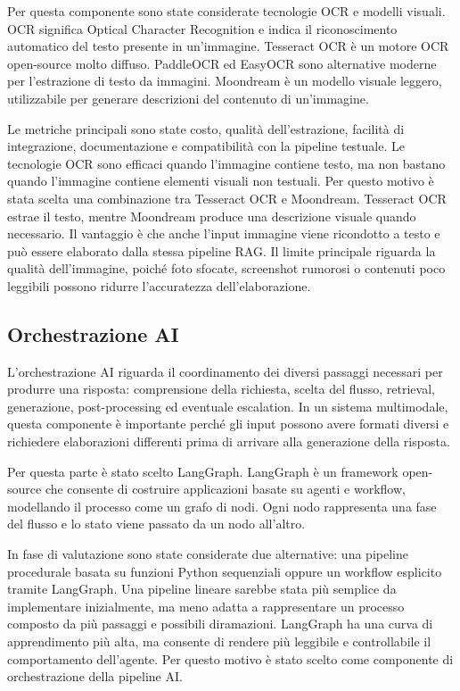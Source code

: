 Per questa componente sono state considerate tecnologie OCR e modelli visuali. OCR significa Optical Character Recognition e indica il riconoscimento automatico del testo presente in un’immagine. Tesseract OCR è un motore OCR open-source molto diffuso. PaddleOCR ed EasyOCR sono alternative moderne per l’estrazione di testo da immagini. Moondream è un modello visuale leggero, utilizzabile per generare descrizioni del contenuto di un’immagine.

Le metriche principali sono state costo, qualità dell’estrazione, facilità di integrazione, documentazione e compatibilità con la pipeline testuale. Le tecnologie OCR sono efficaci quando l’immagine contiene testo, ma non bastano quando l’immagine contiene elementi visuali non testuali. Per questo motivo è stata scelta una combinazione tra Tesseract OCR e Moondream. Tesseract OCR estrae il testo, mentre Moondream produce una descrizione visuale quando necessario. Il vantaggio è che anche l’input immagine viene ricondotto a testo e può essere elaborato dalla stessa pipeline RAG. Il limite principale riguarda la qualità dell’immagine, poiché foto sfocate, screenshot rumorosi o contenuti poco leggibili possono ridurre l’accuratezza dell’elaborazione.

\subsection*{Orchestrazione AI}

L’orchestrazione AI riguarda il coordinamento dei diversi passaggi necessari per produrre una risposta: comprensione della richiesta, scelta del flusso, retrieval, generazione, post-processing ed eventuale escalation. In un sistema multimodale, questa componente è importante perché gli input possono avere formati diversi e richiedere elaborazioni differenti prima di arrivare alla generazione della risposta.

Per questa parte è stato scelto LangGraph. LangGraph è un framework open-source che consente di costruire applicazioni basate su agenti e workflow, modellando il processo come un grafo di nodi. Ogni nodo rappresenta una fase del flusso e lo stato viene passato da un nodo all’altro.

In fase di valutazione sono state considerate due alternative: una pipeline procedurale basata su funzioni Python sequenziali oppure un workflow esplicito tramite LangGraph. Una pipeline lineare sarebbe stata più semplice da implementare inizialmente, ma meno adatta a rappresentare un processo composto da più passaggi e possibili diramazioni. LangGraph ha una curva di apprendimento più alta, ma consente di rendere più leggibile e controllabile il comportamento dell’agente. Per questo motivo è stato scelto come componente di orchestrazione della pipeline AI.

